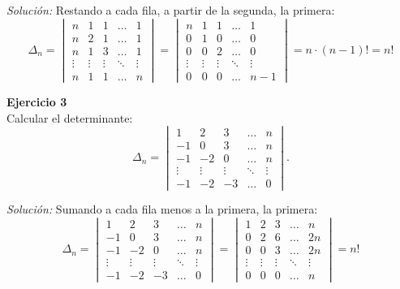 \documentclass{article}
\newenvironment{problem}[2][Ejercicio]
    { \begin{mdframed}[backgroundcolor=gray!20] \textbf{#1 #2} \\}
    {  \end{mdframed}}
\newenvironment{solution}
    {\textit{Solución:}}
    {}
\begin{document}
\begin{solution}
    Restando a cada fila, a partir de la segunda, la primera:
\[
\Delta_n = \begin{vmatrix}
n & 1 & 1 & \dots & 1 \\
n & 2 & 1 & \dots & 1 \\
n & 1 & 3 & \dots & 1 \\
\vdots & \vdots & \vdots & \ddots & \vdots \\
n & 1 & 1 & \dots & n
\end{vmatrix} =
\begin{vmatrix}
n & 1 & 1 & \dots & 1 \\
0 & 1 & 0 & \dots & 0 \\
0 & 0 & 2 & \dots & 0 \\
\vdots & \vdots & \vdots & \ddots & \vdots \\
0 & 0 & 0 & \dots & n-1
\end{vmatrix} = n \cdot (n-1)! = n!
\]
\end{solution}

\begin{problem}{3}
    Calcular el determinante:
\[
\Delta_n = \begin{vmatrix}
1 & 2 & 3 & \dots & n \\
-1 & 0 & 3 & \dots & n \\
-1 & -2 & 0 & \dots & n \\
\vdots & \vdots & \vdots & \ddots & \vdots \\
-1 & -2 & -3 & \dots & 0
\end{vmatrix}.
\]
\end{problem}
\begin{solution}
    Sumando a cada fila menos a la primera, la primera:
\[
\Delta_n = \begin{vmatrix}
1 & 2 & 3 & \dots & n \\
-1 & 0 & 3 & \dots & n \\
-1 & -2 & 0 & \dots & n \\
\vdots & \vdots & \vdots & \ddots & \vdots \\
-1 & -2 & -3 & \dots & 0
\end{vmatrix} = 
\begin{vmatrix}
1 & 2 & 3 & \dots & n \\
0 & 2 & 6 & \dots & 2n \\
0 & 0 & 3 & \dots & 2n \\
\vdots & \vdots & \vdots & \ddots & \vdots \\
0 & 0 & 0 & \dots & n
\end{vmatrix} = n!
\]
\end{solution}
\end{document}
